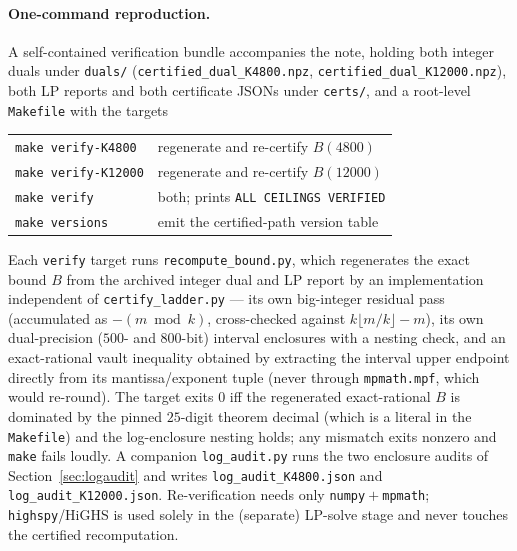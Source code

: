 \documentclass[11pt]{article}
\theoremstyle{remark}
\begin{document}
\paragraph{One-command reproduction.} A self-contained verification bundle
accompanies the note, holding both integer duals under \texttt{duals/}
(\texttt{certified\_dual\_K4800.npz}, \texttt{certified\_dual\_K12000.npz}),
both LP reports and both certificate JSONs under \texttt{certs/}, and a
root-level \texttt{Makefile} with the targets
\begin{center}\small
\begin{tabular}{@{}ll@{}}
\toprule
\texttt{make verify-K4800}  & regenerate and re-certify $B(4800)$ \\
\texttt{make verify-K12000} & regenerate and re-certify $B(12000)$ \\
\texttt{make verify}        & both; prints \texttt{ALL CEILINGS VERIFIED} \\
\texttt{make versions}      & emit the certified-path version table \\
\bottomrule
\end{tabular}
\end{center}
Each \texttt{verify} target runs \texttt{recompute\_bound.py}, which
regenerates the exact bound $B$ from the archived integer dual and LP report
by an implementation independent of \texttt{certify\_ladder.py} --- its own
big-integer residual pass (accumulated as $-(m \bmod k)$, cross-checked
against $k\lfloor m/k\rfloor - m$), its own dual-precision
($500$- and $800$-bit) interval enclosures with a nesting check, and an
exact-rational vault inequality obtained by extracting the interval upper
endpoint directly from its mantissa/exponent tuple (never through
\texttt{mpmath.mpf}, which would re-round). The target exits $0$ iff the
regenerated exact-rational $B$ is dominated by the pinned $25$-digit theorem
decimal (which is a literal in the \texttt{Makefile}) and the log-enclosure
nesting holds; any mismatch exits nonzero and \texttt{make} fails loudly.
A companion \texttt{log\_audit.py} runs the two enclosure audits of
Section~\ref{sec:logaudit} and writes \texttt{log\_audit\_K4800.json} and
\texttt{log\_audit\_K12000.json}. Re-verification needs only
\texttt{numpy}${}+{}$\texttt{mpmath}; \texttt{highspy}/HiGHS is used solely
in the (separate) LP-solve stage and never touches the certified
recomputation.
\end{document}
